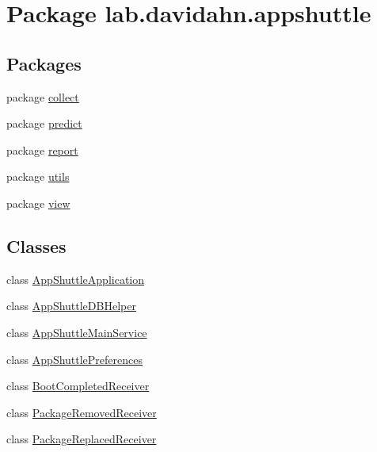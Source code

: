 \hypertarget{namespacelab_1_1davidahn_1_1appshuttle}{\section{\-Package lab.\-davidahn.\-appshuttle}
\label{namespacelab_1_1davidahn_1_1appshuttle}
}
\subsection*{\-Packages}
\begin{DoxyCompactItemize}
\item 
package \hyperlink{namespacelab_1_1davidahn_1_1appshuttle_1_1collect}{collect}
\item 
package \hyperlink{namespacelab_1_1davidahn_1_1appshuttle_1_1predict}{predict}
\item 
package \hyperlink{namespacelab_1_1davidahn_1_1appshuttle_1_1report}{report}
\item 
package \hyperlink{namespacelab_1_1davidahn_1_1appshuttle_1_1utils}{utils}
\item 
package \hyperlink{namespacelab_1_1davidahn_1_1appshuttle_1_1view}{view}
\end{DoxyCompactItemize}
\subsection*{\-Classes}
\begin{DoxyCompactItemize}
\item 
class \hyperlink{classlab_1_1davidahn_1_1appshuttle_1_1_app_shuttle_application}{\-App\-Shuttle\-Application}
\item 
class \hyperlink{classlab_1_1davidahn_1_1appshuttle_1_1_app_shuttle_d_b_helper}{\-App\-Shuttle\-D\-B\-Helper}
\item 
class \hyperlink{classlab_1_1davidahn_1_1appshuttle_1_1_app_shuttle_main_service}{\-App\-Shuttle\-Main\-Service}
\item 
class \hyperlink{classlab_1_1davidahn_1_1appshuttle_1_1_app_shuttle_preferences}{\-App\-Shuttle\-Preferences}
\item 
class \hyperlink{classlab_1_1davidahn_1_1appshuttle_1_1_boot_completed_receiver}{\-Boot\-Completed\-Receiver}
\item 
class \hyperlink{classlab_1_1davidahn_1_1appshuttle_1_1_package_removed_receiver}{\-Package\-Removed\-Receiver}
\item 
class \hyperlink{classlab_1_1davidahn_1_1appshuttle_1_1_package_replaced_receiver}{\-Package\-Replaced\-Receiver}
\end{DoxyCompactItemize}
